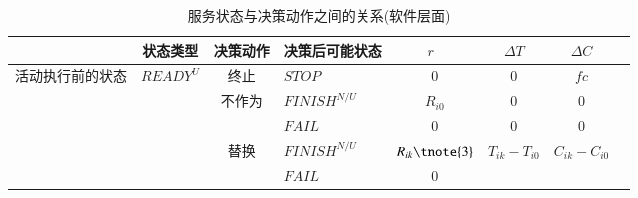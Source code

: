 \begin{table}[htbp]
    \caption{服务状态与决策动作之间的关系(软件层面)}
    \vspace{-0.5em}\label{table:state_action}\centering{}
    \begin{threeparttable}
        \begin{tabular}{llllllll}
            \toprule
            \multicolumn{1}{c}{} 
            & \multicolumn{1}{c}{状态类型\tnote{1}} 
            & \multicolumn{1}{c}{{决策动作}} 
            & \multicolumn{1}{c}{决策后可能状态\tnote{1}} 
            & \multicolumn{1}{c}{$r$~\tnote{2}} 
            & \multicolumn{1}{c}{$\Delta T$} 
            & \multicolumn{1}{c}{$\Delta C$} \\
            \hline
            
            \multicolumn{1}{c}{\multirow{9}{*}{\parbox{1em}{活动执行前的状态}}} 
			& {$READY^U$} 
            & \multicolumn{1}{c}{{终止}} 
            & \multicolumn{1}{l}{$STOP$} 
            & \multicolumn{1}{c}{0} 
            & \multicolumn{1}{c}{0} 
            & \multicolumn{1}{c}{$fc$} \\
            
            \multicolumn{1}{c}{} 
            &       
            & \multicolumn{1}{c}{不作为} 
            & \multicolumn{1}{l}{$FINISH^{N/U}$} 
            & \multicolumn{1}{c}{$R_{i0}$} 
            & \multicolumn{1}{c}{0} 
            & \multicolumn{1}{c}{0} \\
            
            \multicolumn{1}{c}{} 
            &       
            & \multicolumn{1}{c}{} 
            & \multicolumn{1}{l}{$FAIL$} 
            & \multicolumn{1}{c}{0}
            & \multicolumn{1}{c}{0} 
            & \multicolumn{1}{c}{0} \\
            
            \multicolumn{1}{c}{} 
            &       
            & \multicolumn{1}{c}{替换} 
            & \multicolumn{1}{l}{$FINISH^{N/U}$} 
            & \multicolumn{1}{c}{$R_{ik}\tnote{3}$} 
            & \multicolumn{1}{c}{\multirow{2}{*}{$T_{ik}-T_{i0}$}} 
            & \multicolumn{1}{c}{\multirow{2}{*}{$C_{ik}-C_{i0}$}} \\
            
            \multicolumn{1}{c}{} 
            &       
            & \multicolumn{1}{c}{} 
            & \multicolumn{1}{l}{$FAIL$} 
            & \multicolumn{1}{c}{0} 
            & \multicolumn{1}{c}{} 
            & \multicolumn{1}{c}{} \\
            

\end{tabular}
\end{threeparttable}
\end{table}
